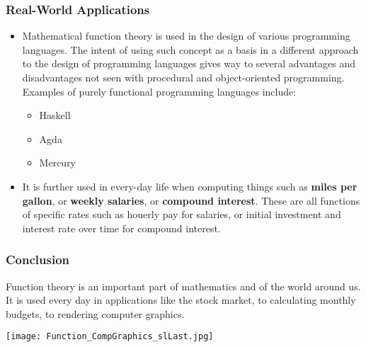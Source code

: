 \documentclass{beamer}
\begin{document}
\begin{frame}[fragile]\frametitle{Real-World Applications}
\begin{itemize}
  \item Mathematical function theory is used in the design of various programming languages. The intent of using such concept as a basis in a different approach to the design of programming languages gives way to several advantages and disadvantages not seen with procedural and object-oriented programming. Examples of purely functional programming languages include:
  \begin{itemize}
    \item{Haskell}
    \item{Agda}
    \item{Mercury}
  \end{itemize}
  \vfill
  \item It is further used in every-day life when computing things such as \textbf{miles per gallon}, or \textbf{weekly salaries}, or \textbf{compound interest}. These are all functions of specific rates such as houerly pay for salaries, or initial investment and interest rate over time for compound interest.
\end{itemize}

\end{frame}

\begin{frame}[fragile]\frametitle{Conclusion}

\begin{center} Function theory is an important part of mathematics and of the world around us. It is used every day in applications like the stock market, to calculating monthly budgets, to rendering computer graphics. \end{center}
\begin{center}\texttt{[image: Function\_CompGraphics\_slLast.jpg]} \end{center}

\end{frame}
\end{document}
